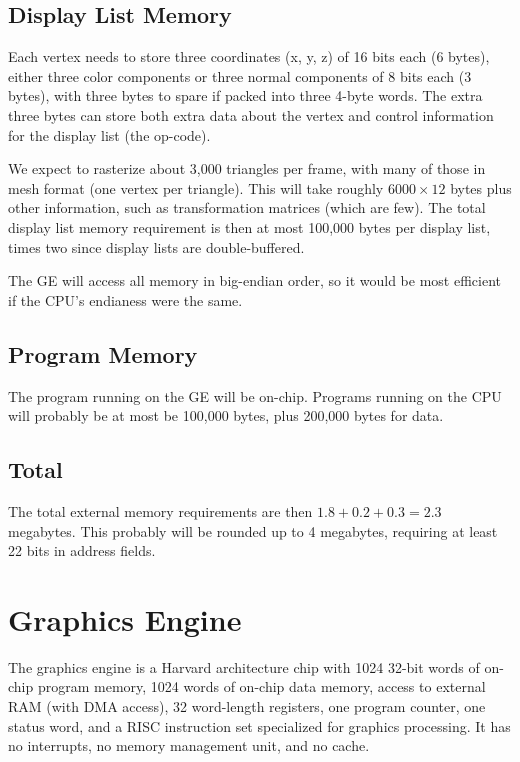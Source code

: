 \documentclass{article}
\begin{document}
\subsection{Display List Memory}

Each vertex needs to store three coordinates (x, y, z) of 16 bits each (6
bytes), either three color components or three normal components of 8
bits each (3 bytes), with three bytes to spare if packed into three
4-byte words.  The extra three bytes can store both extra data about
the vertex and control information for the display list (the op-code).

We expect to rasterize about 3,000 triangles per frame, with many of
those in mesh format (one vertex per triangle).  This will take
roughly $6000 \times 12$ bytes plus other information, such as transformation
matrices (which are few).  The total display list memory requirement
is then at most 100,000 bytes per display list, times two since
display lists are double-buffered.

The GE will access all memory in big-endian order, so it would be most
efficient if the CPU's endianess were the same.

\subsection{Program Memory}

The program running on the GE will be on-chip. Programs running on the
CPU will probably be at most be 100,000 bytes, plus 200,000 bytes for
data.

\subsection{Total}

The total external memory requirements are then $1.8 + 0.2 + 0.3 = 2.3$
megabytes.  This probably will be rounded up to 4 megabytes,
requiring at least 22 bits in address fields.

\section{Graphics Engine}

The graphics engine is a Harvard architecture chip with 1024 32-bit words of
on-chip program memory, 1024 words of on-chip data memory, access to
external RAM (with DMA access), 32 word-length registers, one program
counter, one status word, and a RISC instruction set specialized for
graphics processing.  It has no interrupts, no memory management unit,
and no cache.
\end{document}
